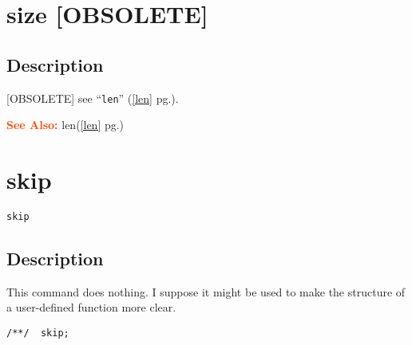\documentclass[a4paper]{mybook}
\newenvironment{command}{}{} %
\newcommand\SeeAlso{\par\textcolor{OrangeRed}{\textbf{\large See Also: }}}
\begin{document}
\section{size [OBSOLETE]}
\label{size [OBSOLETE]}
\begin{command} %



\subsection*{Description}

[OBSOLETE] see ``\verb&len&'' (\ref{len} pg.\pageref{len}).

\SeeAlso %
  len(\ref{len} pg.\pageref{len})
\end{command} %

\section{skip}
\label{skip}
\begin{command} %


\begin{Verbatim}[label=syntax, rulecolor=\color{MidnightBlue},
frame=single]
skip
\end{Verbatim}


\subsection*{Description}

This command does nothing.  I suppose it might be used to make the
structure of a user-defined function more clear.
\begin{Verbatim}[label=example, rulecolor=\color{PineGreen}, frame=single]
/**/  skip;
\end{Verbatim}


\end{command} %
\end{document}
